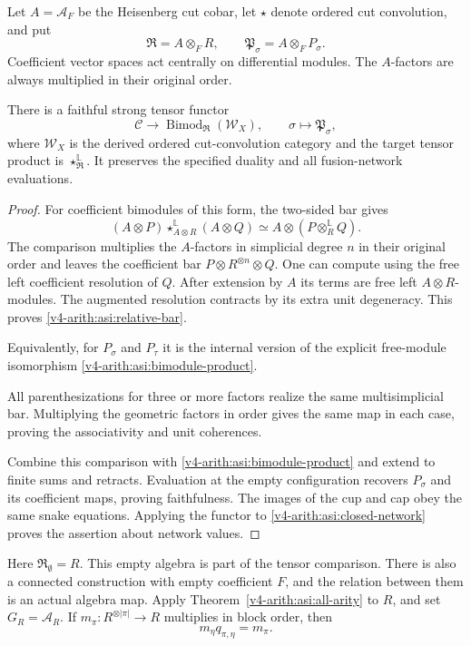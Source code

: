 Let $A=\mathcal A_F$ be the Heisenberg cut cobar, let $\star$ denote
ordered cut convolution, and put
\[
 \mathfrak R=A\otimes_F R,\qquad
 \mathfrak P_\sigma=A\otimes_F P_\sigma.
\]
Coefficient vector spaces act centrally on differential modules. The
$A$-factors are always multiplied in their original order.
\begin{theorem}\label{v4-arith:asi:relative-realization}
There is a faithful strong tensor functor
\[
 \mathcal C\longrightarrow
 \operatorname{Bimod}_{\mathfrak R}(\mathcal W_X),\qquad
 \sigma\longmapsto\mathfrak P_\sigma,
\]
where $\mathcal W_X$ is the derived ordered cut-convolution category and
the target tensor product is $\star^{\mathbb L}_{\mathfrak R}$.
It preserves the specified duality and all fusion-network evaluations.
\end{theorem}
\begin{proof}
For coefficient bimodules of this form, the two-sided bar gives
\begin{equation}\label{v4-arith:asi:relative-bar}
 (A\otimes P)\star^{\mathbb L}_{A\otimes R}(A\otimes Q)
 \simeq A\otimes(P\otimes_R^{\mathbb L}Q).
\end{equation}
The comparison multiplies the $A$-factors in simplicial degree $n$ in
their original order and leaves the coefficient bar
$P\otimes R^{\otimes n}\otimes Q$.
One can compute using the free left coefficient resolution of $Q$.
After extension by $A$ its terms are free left $A\otimes R$-modules.
The augmented resolution contracts by its extra unit degeneracy.
This proves \eqref{v4-arith:asi:relative-bar}.

Equivalently, for $P_\sigma$
and $P_\tau$ it is the internal version of the explicit free-module
isomorphism \eqref{v4-arith:asi:bimodule-product}.

All parenthesizations for three or more factors realize the same
multisimplicial bar. Multiplying the geometric factors in order gives
the same map in each case, proving the associativity and unit coherences.

Combine this comparison with \eqref{v4-arith:asi:bimodule-product} and extend
to finite sums and retracts. Evaluation at the empty configuration
recovers $P_\sigma$ and its coefficient maps, proving faithfulness.
The images of the cup and cap obey the same snake equations. Applying
the functor to \eqref{v4-arith:asi:closed-network} proves the assertion about
network values.
\end{proof}

Here \(\mathfrak R_\emptyset=R\). This empty algebra is part of
the tensor comparison. There is also a connected construction
with empty coefficient $F$, and the relation between them is an actual
algebra map. Apply Theorem~\ref{v4-arith:asi:all-arity} to $R$, and set
$G_R=\mathcal A_R$. If $m_\pi:R^{\otimes|\pi|}\to R$ multiplies in
block order, then
\[
 m_\eta q_{\pi,\eta}=m_\pi.
\]

